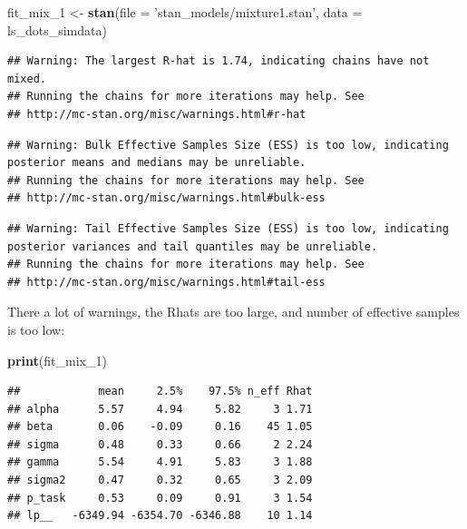 \documentclass[12pt,]{krantz}
\newenvironment{Shaded}{\begin{snugshade}}{\end{snugshade}}
\newcommand{\KeywordTok}[1]{\textcolor[rgb]{0.13,0.29,0.53}{\textbf{#1}}}
\newcommand{\DataTypeTok}[1]{\textcolor[rgb]{0.13,0.29,0.53}{#1}}
\newcommand{\DecValTok}[1]{\textcolor[rgb]{0.00,0.00,0.81}{#1}}
\newcommand{\StringTok}[1]{\textcolor[rgb]{0.31,0.60,0.02}{#1}}
\newcommand{\NormalTok}[1]{#1}
\theoremstyle{definition}
\theoremstyle{definition}
\theoremstyle{definition}
\theoremstyle{remark}
\begin{document}
\begin{Shaded}
\begin{Highlighting}[]
\NormalTok{fit_mix_}\DecValTok{1}\NormalTok{ <-}\StringTok{ }\KeywordTok{stan}\NormalTok{(}\DataTypeTok{file =} \StringTok{'stan_models/mixture1.stan'}\NormalTok{,}
               \DataTypeTok{data =}\NormalTok{ ls_dots_simdata)   }
\end{Highlighting}
\end{Shaded}

\begin{verbatim}
## Warning: The largest R-hat is 1.74, indicating chains have not mixed.
## Running the chains for more iterations may help. See
## http://mc-stan.org/misc/warnings.html#r-hat
\end{verbatim}

\begin{verbatim}
## Warning: Bulk Effective Samples Size (ESS) is too low, indicating posterior means and medians may be unreliable.
## Running the chains for more iterations may help. See
## http://mc-stan.org/misc/warnings.html#bulk-ess
\end{verbatim}

\begin{verbatim}
## Warning: Tail Effective Samples Size (ESS) is too low, indicating posterior variances and tail quantiles may be unreliable.
## Running the chains for more iterations may help. See
## http://mc-stan.org/misc/warnings.html#tail-ess
\end{verbatim}

There a lot of warnings, the Rhats are too large, and number of
effective samples is too low:

\begin{Shaded}
\begin{Highlighting}[]
\KeywordTok{print}\NormalTok{(fit_mix_}\DecValTok{1}\NormalTok{) }
\end{Highlighting}
\end{Shaded}

\begin{verbatim}
##            mean     2.5%    97.5% n_eff Rhat
## alpha      5.57     4.94     5.82     3 1.71
## beta       0.06    -0.09     0.16    45 1.05
## sigma      0.48     0.33     0.66     2 2.24
## gamma      5.54     4.91     5.83     3 1.88
## sigma2     0.47     0.32     0.65     3 2.09
## p_task     0.53     0.09     0.91     3 1.54
## lp__   -6349.94 -6354.70 -6346.88    10 1.14
\end{verbatim}
\end{document}
